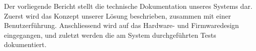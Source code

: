 
Der vorliegende  Bericht stellt  die technische Dokumentation  unseres Systems
dar.  Zuerst wird das Konzept unserer L\"osung beschrieben, zusammen mit einer
Benutzerf\"uhrung.  Anschliessend  wird auf  das Hardware-  und Firmwaredesign
eingegangen,  und   zuletzt  werden  die  am   System  durchgef\"uhrten  Tests
dokumentiert.

\lipsum
